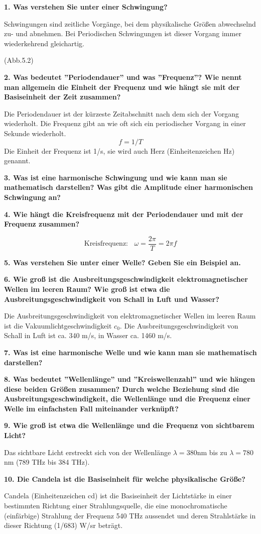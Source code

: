 \documentclass[12pt,a4paper,twoside]{book}
\newcommand{\nqu}[1]{\vspace*{10mm} \noindent \textbf{#1} \par \vspace*{1mm}}
\begin{document}
\nqu{1. Was verstehen Sie unter einer Schwingung?}
Schwingungen sind zeitliche Vorgänge, bei dem physikalische Größen abwechselnd zu- und abnehmen. Bei Periodischen Schwingungen ist dieser Vorgang immer wiederkehrend gleichartig.

(Abb.5.2)

\nqu{2. Was bedeutet ''Periodendauer'' und was ''Frequenz''? Wie nennt man allgemein die Einheit der Frequenz und wie hängt sie mit der Basiseinheit der Zeit zusammen?}
Die Periodendauer ist der kürzeste Zeitabschnitt nach dem sich der Vorgang wiederholt. Die Frequenz gibt an wie oft sich ein periodischer Vorgang in einer Sekunde wiederholt.
\[f=1/T\]
Die Einheit der Frequenz ist 1/s, sie wird auch Herz (Einheitenzeichen Hz) genannt.

\nqu{3. Was ist eine harmonische Schwingung und wie kann man sie mathematisch darstellen? Was gibt die Amplitude einer harmonischen Schwingung an?}


\nqu{4. Wie hängt die Kreisfrequenz mit der Periodendauer und mit der Frequenz zusammen?}
\[\textrm{Kreisfrequenz:}~~~~\omega = \frac{2\pi}{T}= 2\pi f\]

\nqu{5. Was verstehen Sie unter einer Welle? Geben Sie ein Beispiel an.}

\nqu{6. Wie groß ist die Ausbreitungsgeschwindigkeit elektromagnetischer Wellen im leeren Raum? Wie groß ist etwa die Ausbreitungsgeschwindigkeit von Schall in Luft und Wasser?}
Die Ausbreitungsgeschwindigkeit von elektromagnetischer Wellen im leeren Raum ist die Vakuumlichtgeschwindigkeit $c_0$. Die Ausbreitungsgeschwindigkeit von Schall in Luft ist ca. 340 m/s, in Wasser ca. 1460 m/s.

\nqu{7. Was ist eine harmonische Welle und wie kann man sie mathematisch darstellen?}

\nqu{8. Was bedeutet ''Wellenlänge'' und ''Kreiswellenzahl'' und wie hängen diese beiden Größen zusammen? Durch welche Beziehung sind die Ausbreitungsgeschwindigkeit, die Wellenlänge und die Frequenz einer Welle im einfachsten Fall miteinander verknüpft?}

\nqu{9. Wie groß ist etwa die Wellenlänge und die Frequenz von sichtbarem Licht?}
Das sichtbare Licht erstreckt sich von der Wellenlänge $\lambda =380$nm bis zu $\lambda=780$nm (789 THz bis 384 THz).

\nqu{10. Die Candela ist die Basiseinheit für welche physikalische Größe?}
Candela (Einheitenzeichen cd) ist die Basiseinheit der Lichtstärke in einer bestimmten Richtung einer Strahlungsquelle, die eine monochromatische (einfärbige) Strahlung der Frequenz 540 THz aussendet und deren Strahlstärke in dieser Richtung (1/683) W/sr beträgt.
\end{document}
